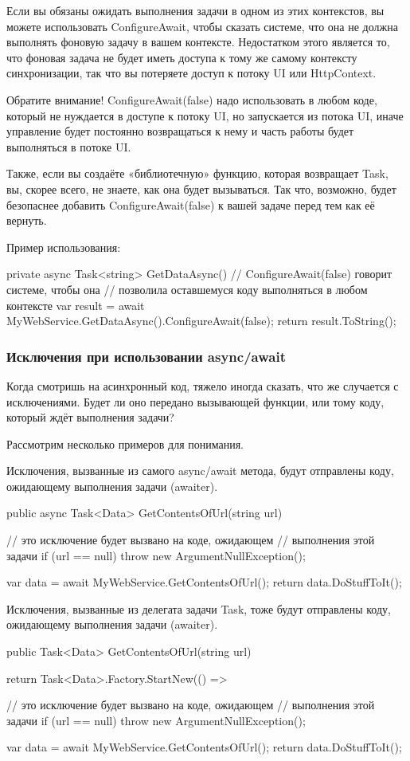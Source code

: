 Если вы обязаны ожидать выполнения задачи в одном из этих контекстов, вы можете использовать ConfigureAwait, чтобы сказать системе, что она не должна выполнять фоновую задачу в вашем контексте. Недостатком этого является то, что фоновая задача не будет иметь доступа к тому же самому контексту синхронизации, так что вы потеряете доступ к потоку UI или HttpContext.

Обратите внимание! ConfigureAwait(false) надо использовать в любом коде, который не нуждается в доступе к потоку UI, но запускается из потока UI, иначе управление будет постоянно возвращаться к нему и часть работы будет выполняться в потоке UI.

Также, если вы создаёте «библиотечную» функцию, которая возвращает Task, вы, скорее всего, не знаете, как она будет вызываться. Так что, возможно, будет безопаснее добавить ConfigureAwait(false) к вашей задаче перед тем как её вернуть.

Пример использования:

private async Task<string> GetDataAsync()
{
    // ConfigureAwait(false) говорит системе, чтобы она
    // позволила оставшемуся коду выполняться в любом контексте
    var result = await MyWebService.GetDataAsync().ConfigureAwait(false);
    return result.ToString();
}

\subsubsection{Исключения при использовании async/await}

Когда смотришь на асинхронный код, тяжело иногда сказать, что же случается с исключениями. Будет ли оно передано вызывающей функции, или тому коду, который ждёт выполнения задачи?

Рассмотрим несколько примеров для понимания.

Исключения, вызванные из самого async/await метода, будут отправлены коду, ожидающему выполнения задачи (awaiter).

public async Task<Data> GetContentsOfUrl(string url)
{
    // это исключение будет вызвано на коде, ожидающем 
    // выполнения этой задачи
    if (url == null) throw new ArgumentNullException();

    var data = await MyWebService.GetContentsOfUrl();
    return data.DoStuffToIt();
}

Исключения, вызванные из делегата задачи Task, тоже будут отправлены коду, ожидающему выполнения задачи (awaiter).

public Task<Data> GetContentsOfUrl(string url)
{
    return Task<Data>.Factory.StartNew(() =>
    {
        // это исключение будет вызвано на коде, ожидающем 
        // выполнения этой задачи
        if (url == null) throw new ArgumentNullException();

        var data = await MyWebService.GetContentsOfUrl();
        return data.DoStuffToIt();
    }
}

